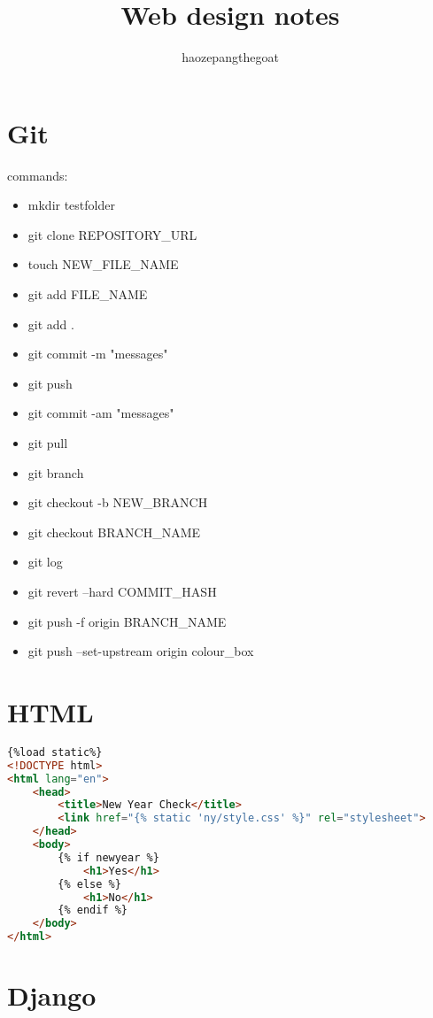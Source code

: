 \documentclass[12pt,a4paper]{article}
\title{Web design notes}
\author{haozepangthegoat}
\begin{document}
\maketitle
\section{Git}
\ttfamily
commands:
\begin{itemize}
		\item mkdir testfolder
		\item git clone REPOSITORY\_URL
		\item touch NEW\_FILE\_NAME
		\item git add FILE\_NAME
		\item git add . 
		\item git commit -m "messages"
		\item git push
		\item git commit -am "messages"
		\item git pull
		\item git branch
		\item git checkout -b NEW\_BRANCH
		\item git checkout BRANCH\_NAME
		\item git log
		\item git revert --hard COMMIT\_HASH
		\item git push -f origin BRANCH\_NAME
		\item git push --set-upstream origin colour\_box

\end{itemize}
\normalfont
\section{HTML}
\begin{tcolorbox}[title= \centering Example code, colback= VSblack, width =150mm]
\centering
	\begin{lstlisting}[language = HTML]
{%load static%}
<!DOCTYPE html>
<html lang="en">
    <head>
        <title>New Year Check</title>
        <link href="{% static 'ny/style.css' %}" rel="stylesheet">
    </head>
    <body>
        {% if newyear %}
            <h1>Yes</h1>
        {% else %}
            <h1>No</h1>
        {% endif %}
    </body>
</html>	\end{lstlisting}
\end{tcolorbox}
%
\section{Django}
\end{document}
